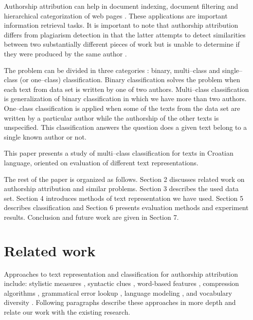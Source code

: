 \documentclass[11pt,english]{article}
\begin{document}
\begin{multicols}{2}
Authorship attribution can help in document indexing, document filtering and
hierarchical categorization of web pages \citep{luyckx2005shallow}. These applications are important information retrieval tasks. It is important to note that authorship attribution differs from plagiarism detection in that the latter attempts to detect similarities between two substantially different pieces of work but is unable to determine if they were produced by the same author \citep{de2001mining}.

The problem can be divided in three categories \citep{zhao2005effective}: binary,
multi--class and single--class (or one--class) classification. Binary
classification solves the problem when each text from data set is written by
one of two authors. Multi--class classification is generalization of binary
classification in which we have more than two authors. One--class
classification is applied when some of the texts from the data set are written
by a particular author while the authorship of the other texts is unspecified.
This classification answers the question does a given text belong to
a single known author or not.

This paper presents a study of multi--class classification for
texts in Croatian language, oriented on evaluation of different text
representations.

The rest of the paper is organized as follows. Section 2 discusses related
work on authorship attribution and similar problems. Section 3 describes the used data set. Section 4 introduces methods of text representation we have used. Section 5 describes classification and Section 6 presents evaluation methods and experiment results. Conclusion and future work are given in Section 7.

\section{Related work}
Approaches to text representation and classification for authorship attribution include: stylistic measures \citep{coyotl2006authorship}, syntactic clues \citep{stamatatos2001computer,uzuner2005comparative}, word-based features \citep{argamon2005measuring,uzuner2005comparative}, compression algorithms \citep{kukushkina2001using,zhao2005effective}, grammatical error lookup \citep{koppel2003exploiting}, language modeling \citep{peng2003language,coyotl2006authorship}, and vocabulary diversity \citep{stamatatos2001computer}. Following paragraphs describe these approaches in more depth and relate our work with the existing research.


\end{multicols}
\end{document}
